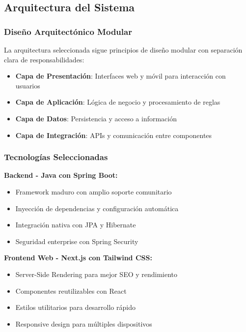 \subsection{Arquitectura del Sistema}

\subsubsection{Diseño Arquitectónico Modular}

La arquitectura seleccionada sigue principios de diseño modular con separación clara de responsabilidades:

\begin{itemize}
\item \textbf{Capa de Presentación}: Interfaces web y móvil para interacción con usuarios
\item \textbf{Capa de Aplicación}: Lógica de negocio y procesamiento de reglas
\item \textbf{Capa de Datos}: Persistencia y acceso a información
\item \textbf{Capa de Integración}: APIs y comunicación entre componentes
\end{itemize}

\subsubsection{Tecnologías Seleccionadas}

\textbf{Backend - Java con Spring Boot:}
\begin{itemize}
\item Framework maduro con amplio soporte comunitario
\item Inyección de dependencias y configuración automática
\item Integración nativa con JPA y Hibernate
\item Seguridad enterprise con Spring Security
\end{itemize}

\textbf{Frontend Web - Next.js con Tailwind CSS:}
\begin{itemize}
\item Server-Side Rendering para mejor SEO y rendimiento
\item Componentes reutilizables con React
\item Estilos utilitarios para desarrollo rápido
\item Responsive design para múltiples dispositivos
\end{itemize}


